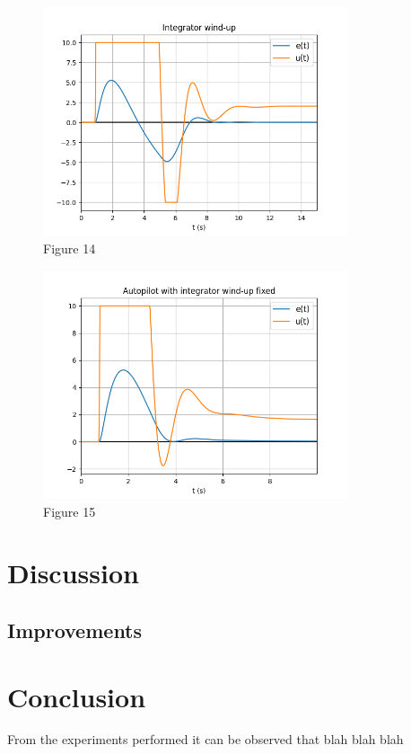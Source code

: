 \documentclass[8pt]{article}
\begin{document}
\newpage

\begin{figure}
    \centering
    \includegraphics[width=0.8\textwidth]{figures/FIGURE_14.png}
    \caption{Figure 14}
    \label{fig:figure14}
\end{figure}

\begin{figure}
    \centering
    \includegraphics[width=0.8\textwidth]{figures/FIGURE_15.png}
    \caption{Figure 15}
    \label{fig:figure15}
\end{figure}

\newpage

\section{Discussion}


\subsection{Improvements}

\section{Conclusion}

From the experiments performed it can be observed that blah blah blah
\end{document}
